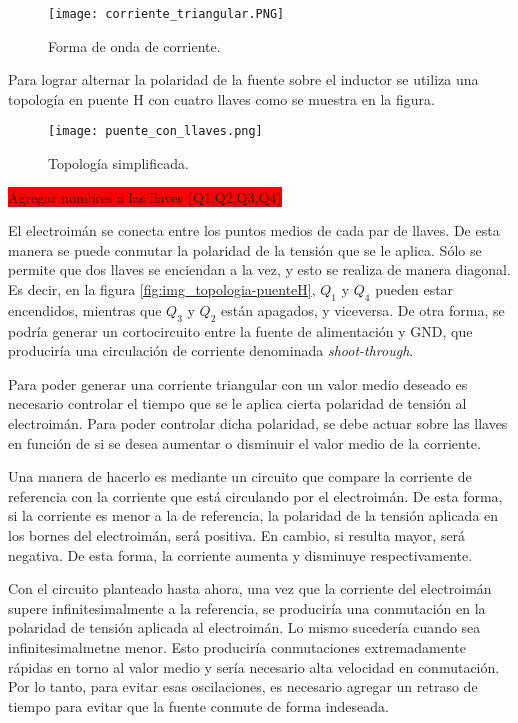 \begin{figure}[H]
	\centering
	\texttt{[image: corriente\_triangular.PNG]}
	\caption{Forma de onda de corriente.}
	\label{fig:img_corriente_triangular_2}
\end{figure}


\noindent Para lograr alternar la polaridad de la fuente sobre el inductor se utiliza una topología en puente H con cuatro llaves como se  muestra en la figura.

\begin{figure}[H]
	\centering
	\texttt{[image: puente\_con\_llaves.png]}
	\caption{Topología simplificada.}
	\label{fig:img_topologia_simplificada}
\end{figure} 
\colorbox{red}{Agregar nombres a las llaves (Q1,Q2,Q3,Q4)}

El electroimán se conecta entre los puntos medios de cada par de llaves. De esta manera se puede conmutar la polaridad de la tensión que se le aplica. Sólo se permite que dos llaves se enciendan a la vez, y esto se realiza de manera diagonal. Es decir, en la figura \ref{fig:img_topologia-puenteH}, $Q_1$ y $Q_4$ pueden estar encendidos, mientras que $Q_3$ y $Q_2$ están apagados, y viceversa. De otra forma, se podría generar un cortocircuito entre la fuente de alimentación y GND, que produciría una circulación de corriente denominada \textsl{shoot-through}.

Para poder generar una corriente triangular con un valor medio deseado es necesario controlar el tiempo que se le aplica cierta polaridad de tensión al electroimán. Para poder controlar dicha polaridad, se debe actuar sobre las llaves en función de si se desea aumentar o disminuir el valor medio de la corriente. 

Una manera de hacerlo es mediante un circuito que compare la corriente de referencia con la corriente que está circulando por el electroimán. De esta forma, si la corriente es menor a la de referencia, la polaridad de la tensión aplicada en los bornes del electroimán, será positiva. En cambio, si resulta mayor, será negativa. De esta forma, la corriente aumenta y disminuye respectivamente. 

Con el circuito planteado hasta ahora, una vez que la corriente del electroimán supere infinitesimalmente a la referencia, se produciría una conmutación en la polaridad de tensión aplicada al electroimán. Lo mismo sucedería cuando sea infinitesimalmetne menor. Esto produciría conmutaciones extremadamente rápidas en torno al valor medio y sería necesario alta velocidad en conmutación. Por lo tanto, para evitar esas oscilaciones, es necesario agregar un retraso de tiempo para evitar que la fuente conmute de forma indeseada.


